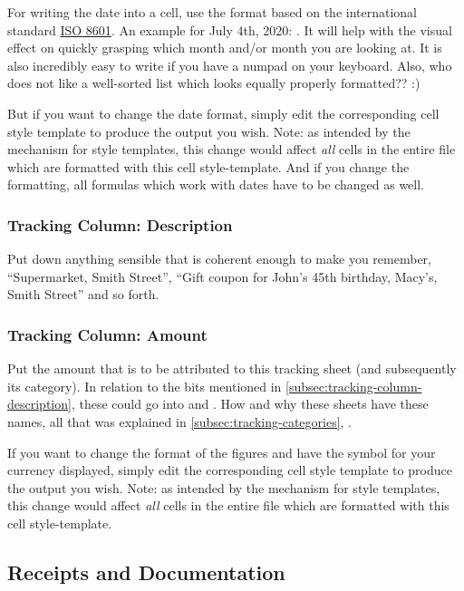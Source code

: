 For writing the date into a cell, use the format  based on the international standard \href{https://en.wikipedia.org/wiki/ISO_8601}{ISO 8601}.
An example for July 4th, 2020: .
It will help with the visual effect on quickly grasping which month and/or month you are looking at.
It is also incredibly easy to write if you have a numpad on your keyboard.
Also, who does not like a well-sorted list which looks equally properly formatted?? :)

But if you want to change the date format, simply edit the corresponding cell style template to produce the output you wish.
Note: as intended by the mechanism for style templates, this change would affect \emph{all} cells in the entire file which are formatted with this cell style-template.
And if you change the formatting, all formulas which work with dates have to be changed as well.

\subsubsection{Tracking Column: Description}
\label{subsec:tracking-column-description}

Put down anything sensible that is coherent enough to make you remember, \eg ``Supermarket, Smith Street'', ``Gift coupon for John's 45th birthday, Macy's, Smith Street'' and so forth.

\subsubsection{Tracking Column: Amount}
\label{subsec:tracking-column-amount}

Put the amount that is to be attributed to this tracking sheet (and subsequently its category).
In relation to the bits mentioned in \autoref{subsec:tracking-column-description}, these could go into  and .
How and why these sheets have these names, all that was explained in \autoref{subsec:tracking-categories}, .

If you want to change the format of the figures and have the symbol for your currency displayed, simply edit the corresponding cell style template to produce the output you wish.
Note: as intended by the mechanism for style templates, this change would affect \emph{all} cells in the entire file which are formatted with this cell style-template.

\subsection{Receipts and Documentation}
\label{subsec:tracking-receipts}


